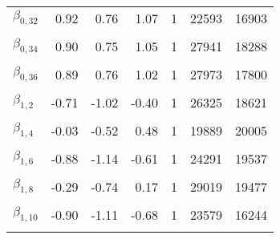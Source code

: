 \begin{longtable}[t]{lrrrrrr}
$\beta_{0, 32}$ & 0.92 & 0.76 & 1.07 & 1 & 22593 & 16903\\
\cellcolor{gray!6}{$\beta_{0, 33}$} & \cellcolor{gray!6}{0.67} & \cellcolor{gray!6}{0.47} & \cellcolor{gray!6}{0.86} & \cellcolor{gray!6}{1} & \cellcolor{gray!6}{8179} & \cellcolor{gray!6}{14140}\\
$\beta_{0, 34}$ & 0.90 & 0.75 & 1.05 & 1 & 27941 & 18288\\
\cellcolor{gray!6}{$\beta_{0, 35}$} & \cellcolor{gray!6}{0.98} & \cellcolor{gray!6}{0.80} & \cellcolor{gray!6}{1.17} & \cellcolor{gray!6}{1} & \cellcolor{gray!6}{18186} & \cellcolor{gray!6}{17930}\\
$\beta_{0, 36}$ & 0.89 & 0.76 & 1.02 & 1 & 27973 & 17800\\
\cellcolor{gray!6}{$\beta_{1, 1}$} & \cellcolor{gray!6}{-0.22} & \cellcolor{gray!6}{-0.53} & \cellcolor{gray!6}{0.08} & \cellcolor{gray!6}{1} & \cellcolor{gray!6}{24033} & \cellcolor{gray!6}{20005}\\
$\beta_{1, 2}$ & -0.71 & -1.02 & -0.40 & 1 & 26325 & 18621\\
\cellcolor{gray!6}{$\beta_{1, 3}$} & \cellcolor{gray!6}{-0.57} & \cellcolor{gray!6}{-0.84} & \cellcolor{gray!6}{-0.29} & \cellcolor{gray!6}{1} & \cellcolor{gray!6}{16844} & \cellcolor{gray!6}{17044}\\
$\beta_{1, 4}$ & -0.03 & -0.52 & 0.48 & 1 & 19889 & 20005\\
\cellcolor{gray!6}{$\beta_{1, 5}$} & \cellcolor{gray!6}{-0.37} & \cellcolor{gray!6}{-0.60} & \cellcolor{gray!6}{-0.15} & \cellcolor{gray!6}{1} & \cellcolor{gray!6}{23202} & \cellcolor{gray!6}{19454}\\
$\beta_{1, 6}$ & -0.88 & -1.14 & -0.61 & 1 & 24291 & 19537\\
\cellcolor{gray!6}{$\beta_{1, 7}$} & \cellcolor{gray!6}{-0.43} & \cellcolor{gray!6}{-0.82} & \cellcolor{gray!6}{-0.04} & \cellcolor{gray!6}{1} & \cellcolor{gray!6}{17776} & \cellcolor{gray!6}{14256}\\
$\beta_{1, 8}$ & -0.29 & -0.74 & 0.17 & 1 & 29019 & 19477\\
\cellcolor{gray!6}{$\beta_{1, 9}$} & \cellcolor{gray!6}{-0.94} & \cellcolor{gray!6}{-1.38} & \cellcolor{gray!6}{-0.50} & \cellcolor{gray!6}{1} & \cellcolor{gray!6}{16813} & \cellcolor{gray!6}{14731}\\
$\beta_{1, 10}$ & -0.90 & -1.11 & -0.68 & 1 & 23579 & 16244\\
\cellcolor{gray!6}{$\beta_{1, 11}$} & \cellcolor{gray!6}{-0.64} & \cellcolor{gray!6}{-0.90} & \cellcolor{gray!6}{-0.38} & \cellcolor{gray!6}{1} & \cellcolor{gray!6}{25065} & \cellcolor{gray!6}{17926}\\

\end{longtable}
